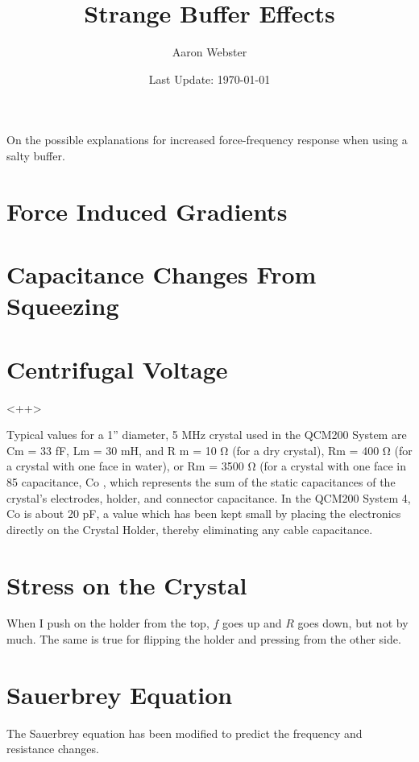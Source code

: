 \documentclass[a4paper]{article}
\begin{document}
\title{Strange Buffer Effects}
\author{Aaron Webster}
\date{Last Update: \today}
\maketitle
\tableofcontents
\newpage

On the possible explanations for increased force-frequency response when
using a salty buffer.


\section{Force Induced Gradients}

\section{Capacitance Changes From Squeezing}

\section{Centrifugal Voltage}<++>

Typical values for a 1” diameter, 5 MHz crystal used in the QCM200 System
are Cm = 33 fF, Lm = 30 mH, and R m = 10 Ω (for a dry crystal), Rm = 400 Ω
(for a crystal with one face in water), or Rm = 3500 Ω (for a crystal with
one face in 85%
capacitance, Co , which represents the sum of the static capacitances of
the crystal’s electrodes, holder, and connector capacitance. In the QCM200
System 4, Co is about 20 pF, a value which has been kept small by placing
the electronics directly on the Crystal Holder, thereby eliminating any
cable capacitance.


\section{Stress on the Crystal}
\cite{filler1988acceleration}


When I push on the holder from the top, $f$ goes up and $R$ goes down, but
not by much.  The same is true for flipping the holder and pressing from
the other side.

\section{Sauerbrey Equation}
The Sauerbrey equation has been modified to predict the frequency and
resistance changes.
\end{document}
